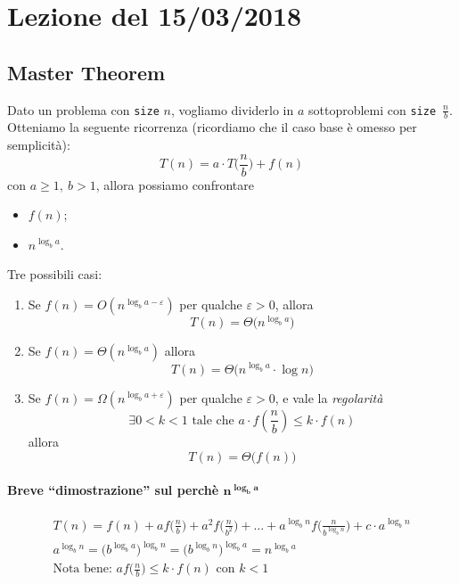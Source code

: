 \section{Lezione del 15/03/2018}

\subsection{Master Theorem} \label{mastertheorem}
Dato un problema con \texttt{size} $n$, vogliamo dividerlo in $a$ sottoproblemi 
con \mbox {\texttt{size} $\frac{n}{b}$}. Otteniamo la seguente ricorrenza (ricordiamo che
il caso base è omesso per semplicità):
\[
    T(n) = a \cdot T\Big(\frac{n}{b}\Big) + f(n)
\]
con $a \geq 1, \ b > 1$, allora possiamo confrontare
\begin{itemize}
    \item $f(n)$;
    \item $n^{\log_b a}$.
\end{itemize}
Tre possibili casi:
\begin{enumerate}
    \item Se $f(n) = O(n^{\log_b a - \varepsilon})$ per qualche $\varepsilon > 0$,
    allora $$T(n) = \Theta \big( n^{\log_b a} \big)$$
    
    \item Se $f(n) = \Theta (n^{\log_b a})$ allora 
    $$T(n) = \Theta \big( n^{\log_b a} \cdot \log n \big)$$
    
    \item Se $f(n) = \Omega (n^{\log_b a + \varepsilon})$ per qualche $\varepsilon > 0$,
    e vale la \emph{regolarità}
    $$ \exists 0 < k < 1 \text{ tale che } a \cdot f(\frac{n}{b}) \leq k \cdot f(n)$$
    allora
    $$ T(n) = \Theta \big( f(n) \big) $$ 
\end{enumerate}

\paragraph{Breve ``dimostrazione'' sul perchè $\boldsymbol{n^{\log_b a}}$} 
\begin{gather*}
    T(n) = f(n) + af\Big(\frac{n}{b}\Big) + a^2f\Big(\frac{n}{b^2}\Big) + \dots + a^{\log_b n}f\Big(\frac{n}{b^{\log_b n}}\Big) + c \cdot a^{\log_b n} \\
    a^{\log_b n} = \big(b^{\log_b a}\big)^{\log_b n} = \big(b^{\log_b n}\big)^{\log_b a} = n^{\log_b a} \\
    \text{Nota bene: } af\Big(\frac{n}{b}\Big) \leq k \cdot f(n) \text{ con } k < 1
\end{gather*}

